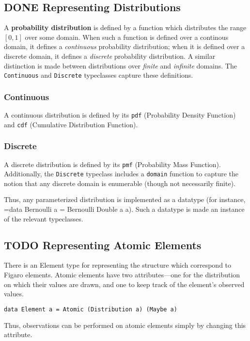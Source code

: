 \documentclass[11pt]{article}
\begin{document}
\subsection{{\bfseries\sffamily DONE} Representing Distributions}
\label{sec-1-4}
A \textbf{probability distribution} is defined by a function which
distributes the range $[0, 1]$ over some domain. When such a
function is defined over a continous domain, it defines a
\emph{continuous} probability distribution; when it is defined over a
discrete domain, it defines a \emph{discrete} probability
distribution. A similar distinction is made between distributions
over \emph{finite} and \emph{infinite} domains. The \texttt{Continuous} and
\texttt{Discrete} typeclasses capture these definitions. 
\subsubsection{Continuous}
\label{sec-1-4-1}
A continuous distribution is defined by its \texttt{pdf} (Probability
Density Function) and \texttt{cdf} (Cumulative Distribution Function).
\subsubsection{Discrete}
\label{sec-1-4-2}
A discrete distribution is defined by its \texttt{pmf} (Probability
Mass Function). Additionally, the \texttt{Discrete} typeclass includes
a \texttt{domain} function to capture the notion that any discrete
domain is enumerable (though not necessarily finite).

Thus, any parameterized distribution is implemented as a datatype
(for instance, =data Bernoulli a = Bernoulli Double a a). Such
a datatype is made an instance of the relevant typeclasses.


\subsection{{\bfseries\sffamily TODO} Representing Atomic Elements}
\label{sec-1-5}
There is an Element type for representing the structure which correspond
to Figaro elements. Atomic elements have two attributes---one for the distribution
on which their values are drawn, and one to keep track of the element's observed
values.

\begin{center}
\texttt{data Element a = Atomic (Distribution a) (Maybe a)}
\end{center}

Thus, observations can be performed on atomic elements simply by
changing this attribute.
\end{document}
